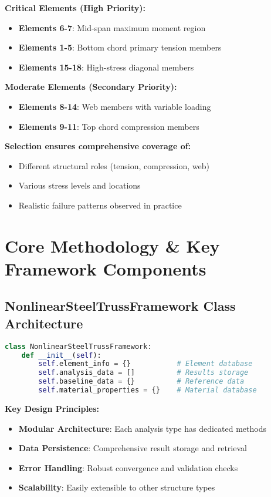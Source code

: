 \documentclass[12pt,a4paper]{article}
\begin{document}
\textbf{Critical Elements (High Priority):}
\begin{itemize}
    \item \textbf{Elements 6-7}: Mid-span maximum moment region
    \item \textbf{Elements 1-5}: Bottom chord primary tension members
    \item \textbf{Elements 15-18}: High-stress diagonal members
\end{itemize}

\textbf{Moderate Elements (Secondary Priority):}
\begin{itemize}
    \item \textbf{Elements 8-14}: Web members with variable loading
    \item \textbf{Elements 9-11}: Top chord compression members
\end{itemize}

\textbf{Selection ensures comprehensive coverage of:}
\begin{itemize}
    \item Different structural roles (tension, compression, web)
    \item Various stress levels and locations
    \item Realistic failure patterns observed in practice
\end{itemize}

\section{Core Methodology \& Key Framework Components}

\subsection{NonlinearSteelTrussFramework Class Architecture}

\begin{lstlisting}[language=Python, caption=Framework Class Structure]
class NonlinearSteelTrussFramework:
    def __init__(self):
        self.element_info = {}           # Element database
        self.analysis_data = []          # Results storage
        self.baseline_data = {}          # Reference data
        self.material_properties = {}    # Material database
\end{lstlisting}

\textbf{Key Design Principles:}
\begin{itemize}
    \item \textbf{Modular Architecture}: Each analysis type has dedicated methods
    \item \textbf{Data Persistence}: Comprehensive result storage and retrieval
    \item \textbf{Error Handling}: Robust convergence and validation checks
    \item \textbf{Scalability}: Easily extensible to other structure types
\end{itemize}
\end{document}
